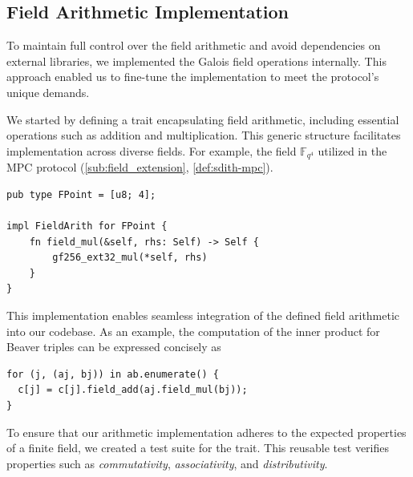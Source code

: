 \documentclass[11pt]{report}
\theoremstyle{definition}
\theoremstyle{plain}
\begin{document}
\subsection{Field Arithmetic Implementation}\label{sub:field_arithmetic}
To maintain full control over the field arithmetic and avoid dependencies on external libraries,
we implemented the Galois field operations internally. This approach enabled us to fine-tune the implementation
to meet the protocol's unique demands.

We started by defining a  trait encapsulating field arithmetic, including essential operations such as addition and multiplication. This generic structure facilitates implementation across diverse fields. For example, the field $\mathbb{F}_{q^4}$ utilized in the MPC protocol (\autoref{sub:field_extension}, \autoref{def:sdith-mpc}).

\begin{verbatim}
pub type FPoint = [u8; 4];

impl FieldArith for FPoint {
    fn field_mul(&self, rhs: Self) -> Self {
        gf256_ext32_mul(*self, rhs)
    }
}
\end{verbatim}

This implementation enables seamless integration of the defined field arithmetic into our codebase.
As an example, the computation of the inner product for Beaver triples can be expressed concisely as

\begin{verbatim}
for (j, (aj, bj)) in ab.enumerate() {
  c[j] = c[j].field_add(aj.field_mul(bj));
}
\end{verbatim}

To ensure that our arithmetic implementation adheres to the expected properties of a finite field, we created a test suite for the trait. This reusable test verifies properties such as \textit{commutativity}, \textit{associativity}, and \textit{distributivity}.
\end{document}
